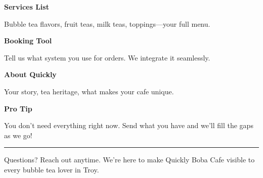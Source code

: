 \documentclass[11pt,letterpaper]{article}
\begin{document}
\begin{minipage}[t]{0.48\textwidth}
\begin{tcolorbox}[colframe=accent-teal, boxrule=1pt, left=0.7em, right=0.7em, top=0.5em, bottom=0.5em, arc=4pt, boxsep=0pt]
{\bfseries\small\color{accent-teal}Services List}

\vspace{0.15em}

{\small Bubble tea flavors, fruit teas, milk teas, toppings—your full menu.}
\end{tcolorbox}

\vspace{0.1em}

\begin{tcolorbox}[colframe=accent-teal, boxrule=1pt, left=0.7em, right=0.7em, top=0.5em, bottom=0.5em, arc=4pt, boxsep=0pt]
{\bfseries\small\color{accent-teal}Booking Tool}

\vspace{0.15em}

{\small Tell us what system you use for orders. We integrate it seamlessly.}
\end{tcolorbox}

\vspace{0.1em}

\begin{tcolorbox}[colframe=accent-teal, boxrule=1pt, left=0.7em, right=0.7em, top=0.5em, bottom=0.5em, arc=4pt, boxsep=0pt]
{\bfseries\small\color{accent-teal}About Quickly}

\vspace{0.15em}

{\small Your story, tea heritage, what makes your cafe unique.}
\end{tcolorbox}

\vspace{0.1em}

\end{minipage}

\vspace{0.15em}

\begin{tcolorbox}[colback={accent-red!5}, colframe=accent-red!20, boxrule=0.5pt, left=0.7em, right=0.7em, top=0.4em, bottom=0.4em, arc=6pt, boxsep=0pt]

{\bfseries\small\color{accent-red}Pro Tip}

\vspace{0.1em}

{\small You don't need everything right now. Send what you have and we'll fill the gaps as we go!}

\end{tcolorbox}

\vspace{0.15em}

\noindent\hrule
\vspace{0.2em}

{\small\color{text-light}Questions? Reach out anytime. We're here to make Quickly Boba Cafe visible to every bubble tea lover in Troy.}
\end{document}
